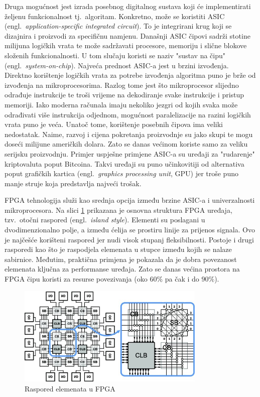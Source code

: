 \documentclass[times, utf8, diplomski]{fer}
\begin{document}
Druga mogućnost jest izrada posebnog digitalnog sustava koji će implementirati željenu funkcionalnost tj.~algoritam. Konkretno, može se koristiti ASIC (engl.~\textit{application-specific integrated circuit}). To je integrirani krug koji se dizajnira i proizvodi za specifičnu namjenu. Današnji ASIC čipovi sadrži stotine milijuna logičkih vrata te može sadržavati procesore, memoriju i slične blokove složenih funkcionalnosti. U tom slučaju koristi se naziv "sustav na čipu" (engl.~\textit{system-on-chip}). Najveća prednost ASIC-a jest u brzini izvođenja. Direktno korištenje logičkih vrata za potrebe izvođenja algoritma puno je brže od izvođenja na mikroprocesorima. Razlog tome jest što mikroprocesor slijedno odrađuje instrukcije te troši vrijeme na dekodiranje svake instrukcije i pristup memoriji. Iako moderna računala imaju nekoliko jezgri od kojih svaka može odrađivati više instrukcija odjednom, mogućnost paralelizacije na razini logičkih vrata puno je veća. Unatoč tome, korištenje posebnih čipova ima veliki nedostatak. Naime, razvoj i cijena pokretanja proizvodnje su jako skupi te mogu doseći milijune američkih dolara. Zato se danas većinom koriste samo za veliku serijsku proizvodnju. Primjer uspješne primjene ASIC-a su uređaji za "rudarenje" kriptovaluta poput Bitcoina. Takvi uređaji su puno učinkovitiji od alternativa poput grafičkih kartica (engl.~\textit{graphics processing unit}, GPU) jer troše puno manje struje koja predstavlja najveći trošak.

FPGA tehnologija služi kao srednja opcija između brzine ASIC-a i univerzalnosti mikroprocesora. Na slici \ref{fig:fpga_island} prikazana je osnovna struktura FPGA uređaja, tzv.~otočni raspored (engl.~\textit{island style}). Elementi su poslagani u dvodimenzionalno polje, a između ćelija se prostiru linije za prijenos signala. Ovo je najčešće korišteni raspored jer nudi visok stupanj fleksibilnosti. Postoje i drugi rasporedi kao što je raspodjela elemenata u stupce između kojih se nalaze sabirnice. Međutim, praktična primjena je pokazala da je dobra povezanost elemenata ključna za performanse uređaja. Zato se danas većina prostora na FPGA čipu koristi za resurse povezivanja (oko $60\%$ pa čak i do $90\%$).

\begin{figure}[htb]
	\centering
	\includegraphics[width=0.8\textwidth]{img/fpga_island_notext.jpg}
	\caption{Raspored elemenata u FPGA}
	\label{fig:fpga_island}
\end{figure}
\end{document}
